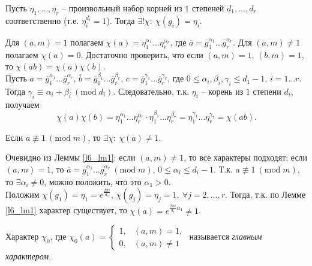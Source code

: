 \begin{lemma} \label{l6_lm1}
	Пусть $\eta_1, \dots, \eta_r$ -- произвольный набор корней из $1$ степеней $d_1, \dots, d_r$ соответственно (т.е. $\eta_i^{d_i} = 1$). 
	Тогда $\exists! \chi: \ \chi(g_i) = \eta_i$. 
\end{lemma}
\begin{pf}
	Для $(a,m)=1$ полагаем $\chi(a) = \eta_1^{\alpha_1} \dots \eta_r^{\alpha_r}$, где $\overline{a} = \overline{g}_1^{\alpha_1} \dots \overline{g}_r^{\alpha_r}$. Для $(a,m) \ne 1$ полагаем $\chi(a) = 0$. Достаточно проверить, что если 
	$(a,m)=1, \, (b,m)=1$, то $\chi(ab) = \chi(a)\chi(b)$.\\
	Пусть $\overline{a} = \overline{g}_1^{\alpha_1} \dots \overline{g}_r^{\alpha_r}, \, \overline{b} = \overline{g}_1^{\beta_1} \dots \overline{g}_r^{\beta_r}, \, \overline{c} = \overline{g}_1^{\gamma_1} \dots \overline{g}_r^{\gamma_r}$, где $0 \leq \alpha_i, \beta_i, \gamma_i \leq d_1 - 1, \, i=1 \dots r$. 
	Тогда $\gamma_i \equiv \alpha_i + \beta_i \ (\mathrm{mod} \; d_i)$. Следовательно, т.к. $\eta_i$ -- корень из $1$ степени $d_i$, получаем
	$$\chi(a)\chi(b) = \eta_1^{\alpha_1} \dots \eta_r^{\alpha_r} \cdot \eta_1^{\beta_1} \dots \eta_r^{\beta_r} = \eta_1^{\gamma_1} \dots \eta_r^{\gamma_r} = \chi(ab).$$
\end{pf}

\begin{lemma} \label{l6_lm2}
	Если $a \not \equiv 1 \ (\mathrm{mod} \; m)$, то $\exists \chi: \ \chi(a) \ne 1$.
\end{lemma}
\begin{pf}
	Очевидно из Леммы \ref{l6_lm1}: если $(a,m) \ne 1$, то все характеры подходят; если $(a,m) = 1$, то $\overline{a}=\overline{g}_1^{\alpha_1} \dots \overline{g}_r^{\alpha_r} \ (\mathrm{mod} \; m), \, 0 \leq \alpha_i \leq d_i-1$. Т.к. $a \not\equiv 1 \ (\mathrm{mod} \; m)$, то $\exists \alpha_i \ne 0$, можно положить, что это $\alpha_1 > 0$.\\
	Положим $\chi\left( g_1 \right) = \eta_1 = e^{\frac{2\pi i}{d_1}}, \, \chi\left( g_j \right) = \eta_j = 1, \ \forall j = 2, \dots, r$. 		Тогда, т.к. по Лемме \ref{l6_lm1} характер существует, то $\chi(a) = e^{\frac{2\pi i}{d_1}\alpha_1} \ne 1$.
\end{pf}

\begin{definition}
	Характер $\chi_0$, где $\chi_0(a) = \begin{cases} 
		1, & (a,m)=1, \\ 
		0, & (a,m) \ne 1 
	\end{cases}$ называется \textit{главным характером}.
\end{definition}

